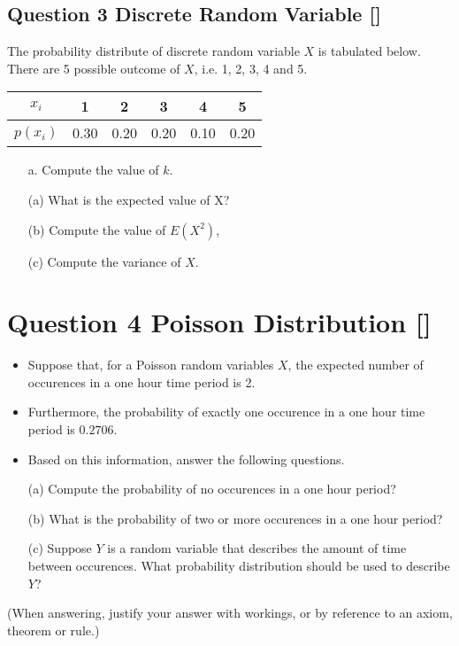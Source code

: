 \subsection*{Question 3 Discrete Random Variable []}
The probability distribute of discrete random variable $X$ is tabulated below. There are 5 possible outcome of $X$, i.e. 1, 2, 3, 4 and 5.
{
\large
\begin{center}
\begin{tabular}{|c||c|c|c|c|c|}
\hline
$x_i$  & 1 & 2 & 3 & 4 & 5  \\\hline
$p(x_i)$ & 0.30 & 0.20 & 0.20 & 0.10 & 0.20 \\
\hline
\end{tabular}
\end{center}
}
\begin{itemize}
%
\item[a.]  Compute the value of $k$.

\item[(a)]  What is the expected value of X?

\item[(b)]  Compute the value of $E(X^2)$,

\item[(c)]  Compute the variance of $X$.
\end{itemize}
\bigskip
\section*{Question 4 Poisson Distribution []}

\begin{itemize}

\item Suppose that, for a Poisson random variables $X$, the expected number of occurences in a one hour time period is 2. 



\item Furthermore, the probability of exactly one occurence in a one
 hour time period is $0.2706$.


\item Based on this information, answer the following questions.
\end{itemize}
\begin{itemize}

\item[(a)]  Compute the probability of no occurences in a one hour period?

\item[(b)]  What is the probability of two or more occurences in a one hour period?

\item[(c)]  Suppose $Y$ is a random variable that describes the amount of time between occurences. What probability distribution should be used to describe $Y$?
\end{itemize}


\noindent (When answering, justify your answer with workings, or by reference to an
axiom, theorem or rule.)
